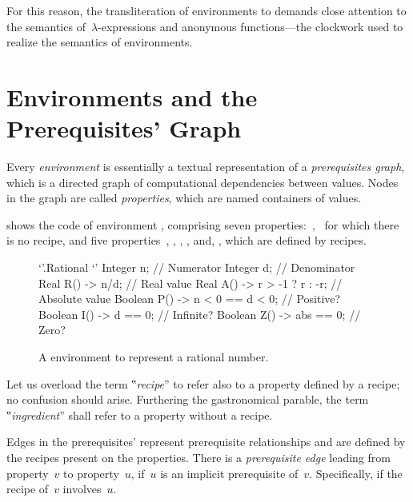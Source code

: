 For this reason, the transliteration of environments to \Java demands close
attention to the semantics of~$λ$-expressions and anonymous functions---the
\Java clockwork used to realize the semantics of environments.

\section{Environments and the Prerequisites' Graph}

Every \emph{environment} is essentially a textual representation of a
\emph{prerequisites graph}, which is a directed graph of computational
dependencies between values. Nodes in the graph are called \emph{properties},
which are named containers of values. 

 shows the \Reap code of environment ,
comprising seven properties:~,~ for which there is no recipe, and
five properties~, , , , and, ,
which are defined by recipes.

\begin{figure}\caption{\label{figure:rational}%
      A \Reap environment to represent a rational number.
    }
  \begin{adjustbox}{max width=\columnwidth}
\begin{reap}
`'.Rational {`'
  Integer n;                      // Numerator
  Integer d;                      // Denominator
  Real    R() -> n/d;             // Real value
  Real    A() -> r > -1 ? r : -r; // Absolute value
  Boolean P() -> n < 0 == d < 0;  // Positive?
  Boolean I() -> d == 0;          // Infinite?
  Boolean Z() -> abs == 0;        // Zero?
}
\end{reap}
\end{adjustbox}
\end{figure}

Let us overload the term ‟\emph{recipe}” to refer also to a property defined by a
recipe; no confusion should arise. Furthering the gastronomical parable, the
term ‟\emph{ingredient}” shall refer to a property without a recipe.

Edges in the prerequisites' represent prerequisite relationships and are
defined by the recipes present on the properties. There is a \emph{prerequisite
edge} leading from property~$v$ to property~$u$, if~$u$ is an implicit
prerequisite of~$v$. Specifically, if the recipe of~$v$ involves~$u$.

